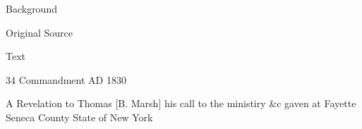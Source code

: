 			\begin{description}
				\item[Background]
			\end{description}
			
			
			\begin{description}
				\item[Original Source]
			\end{description}
			
			
			\begin{description}
				\item[Text]
			\end{description}
			
				\begin{tightcenter}
				34 Commandment AD 1830
				\end{tightcenter}
				
				A Revelation to Thomas [B. Marsh] his call to the ministiry \&c gaven at Fayette Seneca County State of New York
				
